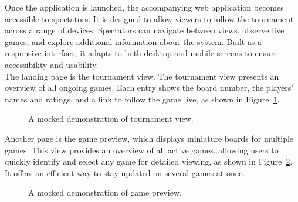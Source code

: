 Once the application is launched, the accompanying web application becomes accessible to spectators. It is designed to allow viewers to follow the tournament across a range of devices. Spectators can navigate between views, observe live games, and explore additional information about the system. Built as a responsive interface, it adapts to both desktop and mobile screens to ensure accessibility and usability. \\

The landing page is the tournament view. The tournament view presents an overview of all ongoing games. Each entry shows the board number, the players' names and ratings, and a link to follow the game live, as shown in Figure~\ref{fig:tournament-view-mocked}. \\

\begin{figure}[h!] \centering {}\caption[Display of tournament view]{A mocked demonstration of tournament view.}\label{fig:tournament-view-mocked} \end{figure}

Another page is the game preview, which displays miniature boards for multiple games. This view provides an overview of all active games, allowing users to quickly identify and select any game for detailed viewing, as shown in Figure~\ref{fig:game-preview}. It offers an efficient way to stay updated on several games at once. \\

\begin{figure}[h!] \centering {}\caption[Display of game preview]{A mocked demonstration of game preview.}\label{fig:game-preview} \end{figure}

